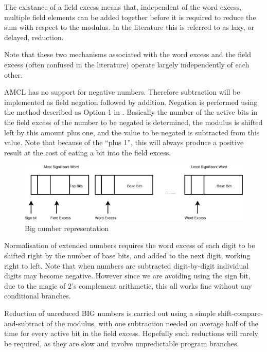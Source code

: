 \documentclass{llncs}
\begin{document}
The existance of a field excess means that, independent of the word excess, multiple field elements can be added together before it is required to reduce the sum with respect to the modulus. In the 
literature this is referred to as lazy, or delayed, reduction.

Note that these two mechanisms associated with the word excess and the field excess (often confused in the literature) operate largely independently of each other.

AMCL has no support for negative numbers. Therefore subtraction will be implemented as field negation followed by addition. Negation is performed using the method described as 
Option 1 in \cite{aranha-karabina-longa-gebotys-lopez}. Basically the 
number of the active bits in the field excess of the number to be negated is determined, the modulus is shifted left by this amount plus one, and the value to be negated is subtracted from this value.
Note that because of the ``plus 1'', this will always produce a positive result at the cost of eating a bit into the field excess.

\begin{figure}[!htb]
  \begin{center}
    \includegraphics[width=120mm ]{words.eps}
  \end{center}
  \caption{\small Big number representation}
  \label{words}
\end{figure}

Normalisation of extended numbers requires the word excess of each digit to be shifted right by the number of base bits, and added to the next digit, working right to left. Note that when numbers 
are subtracted digit-by-digit individual digits may become negative. However
since we are avoiding using the sign bit, due to the magic of 2's complement arithmetic, this all works fine without any conditional branches.

Reduction of unreduced {BIG} numbers is carried out using a simple shift-compare-and-subtract of the modulus, with one subtraction needed on average half of the time for every active bit in the field excess. 
Hopefully such reductions will rarely be required, as they are slow and involve unpredictable program branches.
\end{document}
